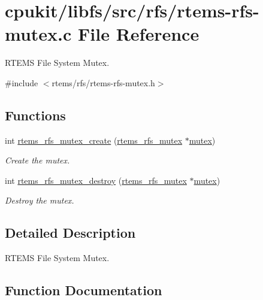 \hypertarget{rtems-rfs-mutex_8c}{}\section{cpukit/libfs/src/rfs/rtems-\/rfs-\/mutex.c File Reference}
\label{rtems-rfs-mutex_8c}


R\+T\+E\+MS File System Mutex.  


{\ttfamily \#include $<$rtems/rfs/rtems-\/rfs-\/mutex.\+h$>$}\newline
\subsection*{Functions}
\begin{DoxyCompactItemize}
\item 
int \mbox{\hyperlink{rtems-rfs-mutex_8c_a4f5527fa74478729e066bbd75bca7bd6}{rtems\+\_\+rfs\+\_\+mutex\+\_\+create}} (\mbox{\hyperlink{rtems-rfs-mutex_8h_a5234b0b9f6a152769b4f405b76461a19}{rtems\+\_\+rfs\+\_\+mutex}} $\ast$\mbox{\hyperlink{structmutex}{mutex}})
\begin{DoxyCompactList}\small\item\em Create the mutex. \end{DoxyCompactList}\item 
int \mbox{\hyperlink{rtems-rfs-mutex_8c_ac494069c1aa2132f8f63226dc0d20b4c}{rtems\+\_\+rfs\+\_\+mutex\+\_\+destroy}} (\mbox{\hyperlink{rtems-rfs-mutex_8h_a5234b0b9f6a152769b4f405b76461a19}{rtems\+\_\+rfs\+\_\+mutex}} $\ast$\mbox{\hyperlink{structmutex}{mutex}})
\begin{DoxyCompactList}\small\item\em Destroy the mutex. \end{DoxyCompactList}\end{DoxyCompactItemize}


\subsection{Detailed Description}
R\+T\+E\+MS File System Mutex. 



\subsection{Function Documentation}
\mbox{\label{rtems-rfs-mutex_8c_a4f5527fa74478729e066bbd75bca7bd6}} 
